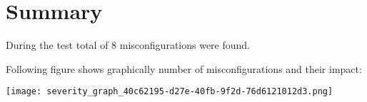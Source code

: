\section{Summary}
During the test total of 8 misconfigurations were found.
                    
                    Following figure shows graphically number of misconfigurations and their impact:
                    

                    \texttt{[image: severity\_graph\_40c62195-d27e-40fb-9f2d-76d6121012d3.png]}